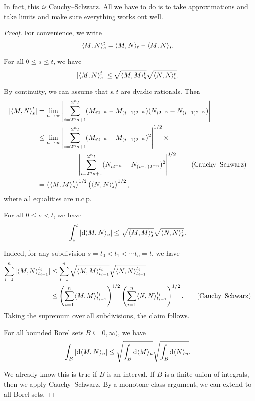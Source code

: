 \documentclass[a4paper]{article}
\begin{document}
In fact, this \emph{is} Cauchy--Schwarz. All we have to do is to take approximations and take limits and make sure everything works out well.
\begin{proof}
  For convenience, we write
  \[
    \langle M, N\rangle_s^t = \langle M, N\rangle_t - \langle M, N\rangle_s.
  \]
  \begin{claim}
    For all $0 \leq s \leq t$, we have
    \[
      |\langle M, N\rangle_s^t| \leq \sqrt{\langle M, M\rangle_s^t} \sqrt{\langle N, N\rangle_s^t}.
    \]
  \end{claim}
  By continuity, we can assume that $s, t$ are dyadic rationals. Then
  \begin{align*}
    |\langle M, N\rangle_s^t| &= \lim_{n \to \infty} \left| \sum_{i = 2^ns + 1}^{2^n t} (M_{i 2^{-n}} - M_{(i - 1)2^{-n}})(N_{i 2^{-n}} -N_{(i - 1)2^{-n}})\right|\\
    &\leq \lim_{n \to \infty} \left| \sum_{i = 2^ns + 1}^{2^n t} (M_{i 2^{-n}} - M_{(i - 1)2^{-n}})^2\right|^{1/2}\times\\
    &\hphantom{aaaaaaaaaaa}\left| \sum_{i = 2^n s + 1}^{2^n t} (N_{i 2^{-n}} - N_{(i - 1)2^{-n}})^2\right|^{1/2}\tag{Cauchy--Schwarz}\\
    &= \left(\langle M, M\rangle_s^t \right)^{1/2}\left(\langle N, N\rangle_s^t\right)^{1/2},
  \end{align*}
  where all equalities are u.c.p.

  \begin{claim}
    For all $0 \leq s < t$, we have
    \[
      \int_s^t |\mathrm{d} \langle M, N\rangle_u| \leq \sqrt{\langle M, M\rangle_s^t}\sqrt{\langle N, N\rangle_s^t}.
    \]
  \end{claim}
  Indeed, for any subdivision $s = t_0 < t_1 < \cdots t_n = t$, we have
  \begin{align*}
    \sum_{i = 1}^n |\langle M, N\rangle_{t_{i - 1}}^{t_i}| &\leq \sum_{i = 1}^n \sqrt{\langle M, M\rangle_{t_{i - 1}}^{t_i}} \sqrt{\langle N, N\rangle_{t_{i - 1}}^{t_i}}\\
    &\leq \left(\sum_{i = 1}^n \langle M, M\rangle_{t_{i - 1}}^{t_i}\right)^{1/2} \left(\sum_{i = 1}^n \langle N, N\rangle_{t_{i - 1}}^{t_i}\right)^{1/2}. \tag{Cauchy--Schwarz}
  \end{align*}
  Taking the supremum over all subdivisions, the claim follows.

  \begin{claim}
    For all bounded Borel sets $B \subseteq [0, \infty)$, we have
    \[
      \int_B |\mathrm{d} \langle M, N\rangle_u| \leq \sqrt{\int_B \mathrm{d} \langle M\rangle_u} \sqrt{\int_B \mathrm{d} \langle N\rangle_u}.
    \]
  \end{claim}
  We already know this is true if $B$ is an interval. If $B$ is a finite union of integrals, then we apply Cauchy--Schwarz. By a monotone class argument, we can extend to all Borel sets.


\end{proof}
\end{document}
